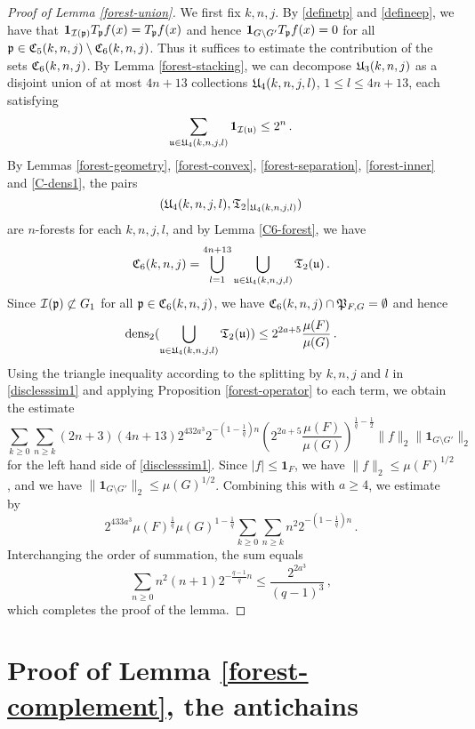 {\begin{proof}[Proof of Lemma \ref{forest-union}]
    We first fix $k,n, j$.
    By \eqref{definetp} and \eqref{defineep}, we have that
    $\mathbf{1}_{{\mathcal{I}}({\mathfrak p})} T_{{\mathfrak p}}f(x) = T_{{\mathfrak p}}f(x)$ and hence $\mathbf{1}_{G \setminus G'} T_{{\mathfrak p}}f(x)= 0$ for all ${\mathfrak p} \in {\mathfrak C}_5(k,n,j) \setminus {\mathfrak C}_6(k,n,j)$.
    Thus it suffices to estimate the contribution of the sets ${\mathfrak C}_6(k,n,j)$. By Lemma \ref{forest-stacking}, we can decompose ${\mathfrak U}_3(k,n,j)$ as a disjoint union of at most $4n + 13$ collections ${\mathfrak U}_4(k,n,j,l)$, $1 \le l \le 4n+13$, each satisfying
    $$
        \sum_{{\mathfrak u} \in {\mathfrak U}_4(k,n,j,l)} \mathbf{1}_{{\mathcal{I}}({\mathfrak u})} \le 2^n\,.
    $$
    By Lemmas \ref{forest-geometry}, \ref{forest-convex}, \ref{forest-separation}, \ref{forest-inner} and \ref{C-dens1}, the pairs
    $$
        ({\mathfrak U}_4(k,n,j,l), \mathfrak{T}_2|_{{\mathfrak U}_4(k,n,j,l)})
    $$
    are $n$-forests for each $k,n,j,l$, and by Lemma \ref{C6-forest}, we have
    $$
        {\mathfrak C}_6(k,n,j) = \bigcup_{l = 1}^{4n + 13} \bigcup_{{\mathfrak u} \in {\mathfrak U}_4(k,n,j,l)} \mathfrak{T}_2({\mathfrak u})\,.
    $$
    Since ${\mathcal{I}}({\mathfrak p}) \not\subset G_1$ for all ${\mathfrak p} \in {\mathfrak C}_6(k,n,j)$, we have ${\mathfrak C}_6(k,n,j) \cap {\mathfrak P}_{F,G} = \emptyset$ and hence
    $$
        \operatorname{\operatorname{dens}}_2(\bigcup_{{\mathfrak u} \in {\mathfrak U}_4(k,n,j,l)} \mathfrak{T}_2({\mathfrak u})) \le 2^{2a + 5} \frac{\mu(F)}{\mu(G)}\,.
    $$
    Using the triangle inequality according to the splitting by $k,n,j$ and $l$ in \eqref{disclesssim1} and applying Proposition \ref{forest-operator} to each term, we obtain the estimate
    $$
        \sum_{k \ge 0}\sum_{n \ge k} (2n+3)(4n+13) 2^{432a^3}2^{-(1-\frac{1}{q})n}(2^{2a+5} \frac{\mu(F)}{\mu(G)})^{\frac{1}{q} - \frac{1}{2}} \|f\|_2 \|\mathbf{1}_{G\setminus G'}\|_2
    $$
    for the left hand side of \eqref{disclesssim1}. Since $|f| \le \mathbf{1}_F$, we have $\|f\|_2 \le \mu(F)^{1/2}$, and we have $\|\mathbf{1}_{G\setminus G'}\|_2 \le \mu(G)^{1/2}$. Combining this with $a \ge 4$, we estimate by
    $$
        2^{433a^3} \mu(F)^{\frac{1}{q}} \mu(G)^{1
        -\frac{1}{q}} \sum_{k \ge 0}\sum_{n \ge k}n^2 2^{-(1-\frac{1}{q})n}\,.
    $$
    Interchanging the order of summation, the sum equals
    $$
        \sum_{n \ge 0} n^2(n+1) 2^{-\frac{q-1}{q}n} \le \frac{2^{2a^3}}{(q-1)^3}\,,
    $$
    which completes the proof of the lemma.
\end{proof}

\section{Proof of Lemma \ref{forest-complement}, the antichains}
\label{subsecantichain}

}
